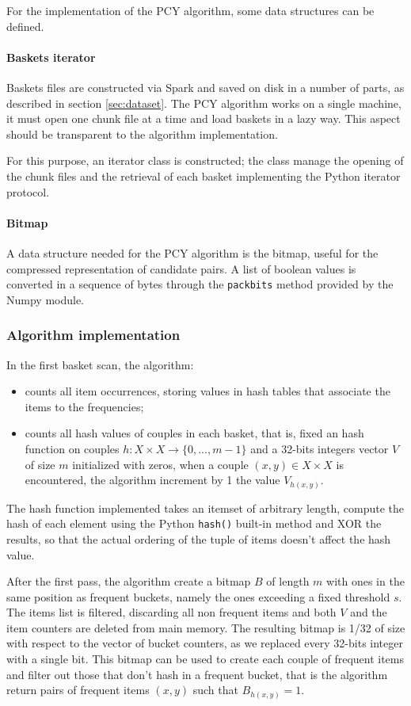 \documentclass{article}
\begin{document}
For the implementation of the PCY algorithm, some data structures can be defined. 

\paragraph{Baskets iterator}

Baskets files are constructed via Spark and saved on disk in a number of parts, as described in section \ref{sec:dataset}. The PCY algorithm works on a single machine, it must open one chunk file at a time and load baskets in a lazy way. This aspect should be transparent to the algorithm implementation. 

For this purpose, an iterator class is constructed; the class manage the opening of the chunk files and the retrieval of each basket implementing the Python iterator protocol.

\paragraph{Bitmap} 
A data structure needed for the PCY algorithm is the bitmap, useful for the compressed representation of candidate pairs. A list of boolean values is converted in a sequence of bytes through the \texttt{packbits} method provided by the Numpy module.

\subsubsection{Algorithm implementation}

In the first basket scan, the algorithm:
\begin{itemize}
	\item counts all item occurrences, storing values in hash tables that associate the items to the frequencies;
	\item counts all hash values of couples in each basket, that is, fixed an hash function on couples $h: X \times X \rightarrow \{0, ..., m-1\}$ and a 32-bits integers vector $V$ of size $m$ initialized with zeros, when a couple $(x, y)\in X\times X$ is encountered, the algorithm increment by 1 the value $V_{h(x,y)}$.
\end{itemize}
The hash function implemented takes an itemset of arbitrary length, compute the hash of each element using the Python \texttt{hash()} built-in method and XOR the results, so that the actual ordering of the tuple of items doesn't affect the hash value.

After the first pass, the algorithm create a bitmap $B$ of length $m$ with ones in the same position as frequent buckets, namely the ones exceeding a fixed threshold $s$. The items list is filtered, discarding all non frequent items and both $V$ and the item counters are deleted from main memory.
The resulting bitmap is 1/32 of size with respect to the vector of bucket counters, as we replaced  every 32-bits integer with a single bit. This bitmap can be used to create each couple of frequent items and filter out those that don't hash in a frequent bucket, that is the algorithm return pairs of frequent items $(x, y)$ such that $B_{h(x, y)} = 1$.
\end{document}
